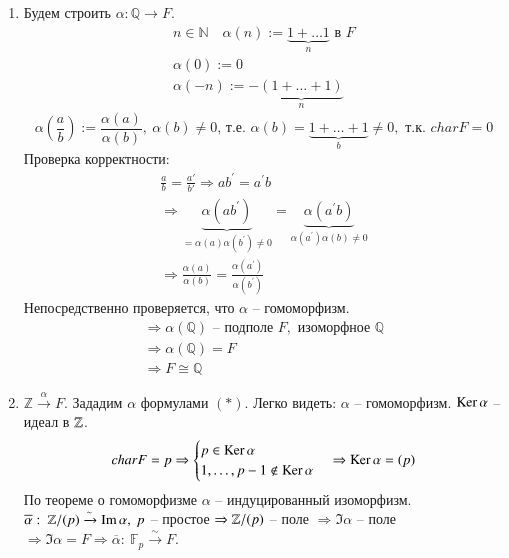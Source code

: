 \documentclass[main]{subfiles}
\begin{document}
\begin{longProof}
    \begin{enumerate}
        \item Будем строить $\alpha: \mathbb{Q} \rightarrow F$.
        \[\left. \begin{gathered}
         n \in \mathbb{N} \quad \alpha(n) := \underbrace{1 + \ldots 1}_n \text{ в } F \\
            \alpha(0) := 0 \\
            \alpha(-n) := -\underbrace{(1 + \ldots + 1)}_n 
        \end{gathered}
        \right. \tag*{(*)} \]
        \[\alpha \left(  \frac{a}{b} \right) := \frac{\alpha(a)}{\alpha(b)}, \ \alpha(b) \ne 0 
        \text{, т.е. } \alpha(b) = \underbrace{1 + \ldots + 1}_b \neq 0, \text{ т.к. } char F = 0\]
        Проверка корректности:
        \begin{gather*}  
            \frac{a}{b} = \frac{a\prime}{b\prime} \Rightarrow ab^\prime = a^\prime b \\
            \Rightarrow \underbrace{\alpha(a b^\prime)}_{=\alpha(a)\alpha(b^\prime) \ne 0}
             = \underbrace{\alpha(a^\prime b)}_{\alpha(a^\prime)\alpha(b) \ne 0} \\
            \Rightarrow \frac{\alpha(a)}{\alpha(b)} = 
            \frac{\alpha(a^\prime)}{\alpha(b^\prime)} 
        \end{gather*}
        Непосредственно проверяется, что $\alpha$ -- гомоморфизм.
        \begin{gather*}
            \Rightarrow \alpha(\mathbb{Q}) \text{ -- подполе } F, \text{ изоморфное } \mathbb{Q}\\
            \Rightarrow \alpha(\mathbb{Q}) = F \\
            \Rightarrow F \cong \mathbb{Q}
        \end{gather*}
        \item
         $\mathbb{Z} \stackrel{\alpha}{\longrightarrow} F$. Зададим $\alpha$ формулами $(*)$. Легко видеть:
        $ \alpha $ -- гомоморфизм. $\operatorname{Ker} \alpha$ -- идеал в $\mathbb{Z}$.
        \begin{gather*}
            char F = p \Rightarrow \begin{cases}
                p \in \operatorname{Ker} \alpha \\
                1, \ldots, p-1 \notin \operatorname{Ker} \alpha
            \end{cases} \Rightarrow \operatorname{Ker} \alpha = (p)
        \end{gather*}
        По теореме о гомоморфизме $\alpha$ -- индуцированный изоморфизм. $\overline{\alpha}: \ \mathbb{Z} / (p) 
        \xrightarrow{\sim} \operatorname{Im} \alpha, \ p$ -- простое $\Rightarrow \mathbb{Z} / (p) $ -- поле 
            $\Rightarrow \Im \alpha$ -- поле
            $\Rightarrow \Im \alpha = F \Rightarrow
            \overline{\alpha}: \ \mathbb{F}_p \xrightarrow{\sim} F$.
    \end{enumerate}
\end{longProof}
\end{document}
